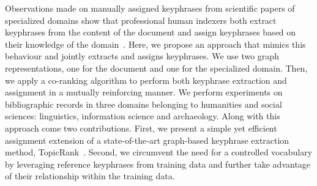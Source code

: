 Observations made on manually assigned keyphrases from scientific papers of specialized domains show that professional human indexers both extract keyphrases from the content of the document and assign keyphrases based on their knowledge of the domain~\cite{liu2011vocabularygap}.
Here, we propose an approach that mimics this behaviour and jointly extracts and assigns keyphrases.
%
We use two graph representations, one for the document and one for the specialized domain.
%
Then, we apply a co-ranking algorithm to perform both keyphrase extraction and assignment in a mutually reinforcing manner.
%
We perform experiments on bibliographic records in three domains belonging to humanities and social sciences: linguistics, information science and archaeology. 
%
Along with this approach come two contributions.
%
First, we present a simple yet efficient assignment extension of a state-of-the-art graph-based keyphrase extraction method, TopicRank~\cite{bougouin2013topicrank}.
%
Second, we circumvent the need for a controlled vocabulary by leveraging reference keyphrases from training data and further take advantage of their relationship within the training data.
